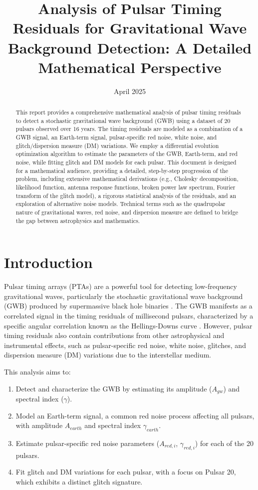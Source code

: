 \documentclass[11pt]{article}
\begin{document}
\title{Analysis of Pulsar Timing Residuals for Gravitational Wave Background Detection: A Detailed Mathematical Perspective}
\author{}
\date{April 2025}
\maketitle

\begin{abstract}
This report provides a comprehensive mathematical analysis of pulsar timing residuals to detect a stochastic gravitational wave background (GWB) using a dataset of 20 pulsars observed over 16 years. The timing residuals are modeled as a combination of a GWB signal, an Earth-term signal, pulsar-specific red noise, white noise, and glitch/dispersion measure (DM) variations. We employ a differential evolution optimization algorithm to estimate the parameters of the GWB, Earth-term, and red noise, while fitting glitch and DM models for each pulsar. This document is designed for a mathematical audience, providing a detailed, step-by-step progression of the problem, including extensive mathematical derivations (e.g., Cholesky decomposition, likelihood function, antenna response functions, broken power law spectrum, Fourier transform of the glitch model), a rigorous statistical analysis of the residuals, and an exploration of alternative noise models. Technical terms such as the quadrupolar nature of gravitational waves, red noise, and dispersion measure are defined to bridge the gap between astrophysics and mathematics.
\end{abstract}

\section{Introduction}
Pulsar timing arrays (PTAs) are a powerful tool for detecting low-frequency gravitational waves, particularly the stochastic gravitational wave background (GWB) produced by supermassive black hole binaries \citep{ipta2013}. The GWB manifests as a correlated signal in the timing residuals of millisecond pulsars, characterized by a specific angular correlation known as the Hellings-Downs curve \citep{hellings1983}. However, pulsar timing residuals also contain contributions from other astrophysical and instrumental effects, such as pulsar-specific red noise, white noise, glitches, and dispersion measure (DM) variations due to the interstellar medium.

This analysis aims to:
\begin{enumerate}
    \item Detect and characterize the GWB by estimating its amplitude ($A_{gw}$) and spectral index ($\gamma$).
    \item Model an Earth-term signal, a common red noise process affecting all pulsars, with amplitude $A_{earth}$ and spectral index $\gamma_{earth}$.
    \item Estimate pulsar-specific red noise parameters ($A_{red,i}$, $\gamma_{red,i}$) for each of the 20 pulsars.
    \item Fit glitch and DM variations for each pulsar, with a focus on Pulsar 20, which exhibits a distinct glitch signature.
\end{enumerate}
\end{document}
